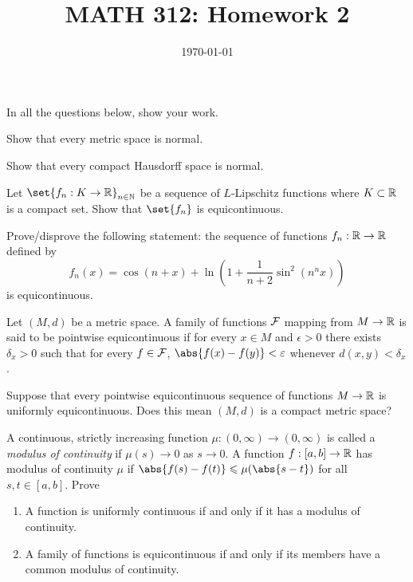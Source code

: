 \documentclass[12pt]{amsart}
\title{ MATH 312: Homework 2 }
\author{}
\date{\today}
\begin{document}
\maketitle



\printbibliography

In all the questions below, show your work.

\begin{question}
	Show that every metric space is normal.
\end{question}

\begin{question}
	Show that every compact Hausdorff space is normal.
\end{question}

\begin{question}
	Let $\set{f_n: K \to \R}_{n\in \N}$ be a sequence of $L$-Lipschitz functions where $K \subset \mathbb{R}$ is a compact set.
	Show that $\set{f_n}$ is equicontinuous.
\end{question}

\begin{question}
	Prove/disprove the following statement:
	the sequence of functions $f_n: \mathbb{R} \to \mathbb{R}$ defined by
	\begin{equation*}
		f_n(x) = \cos(n + x) + \ln \left( 1 + \frac{1}{n + 2} \sin^2 (n^n x) \right)
	\end{equation*}
	is equicontinuous.
\end{question}


\begin{question}
	Let $(M,d)$ be a metric space.
	A family of functions $\mathcal{F}$ mapping from $M \to \mathbb{R}$ is said to be pointwise equicontinuous if for
	every $x \in M$ and $\epsilon > 0$ there exists $\delta_x >0$ such that
	for every $f \in \mathcal{F}$,
	$\abs{f(x) - f(y)} < \epsilon$ whenever $d(x,y) < \delta_x$.

	Suppose that every pointwise equicontinuous sequence of  functions $M \to \mathbb{R}$
	is uniformly equicontinuous.
	Does this mean $(M,d)$ is a compact metric space?
\end{question}

\begin{question}
	A continuous, strictly increasing function $\mu: (0,\infty) \to (0,\infty)$
	is called a \emph{modulus of continuity} if $\mu(s)\to 0$ as $s\to 0$.
	A function $f:[a,b]\to \mathbb{R}$ has modulus of continuity $\mu$ if
	$\abs{f(s) - f(t)} \leq \mu(\abs{s-t})$ for all $s,t\in [a,b]$.
	Prove
	\begin{enumerate}
		\item A function is uniformly continuous if and only if it has a modulus
		      of continuity.
		\item A family of functions is equicontinuous if and only if its members have
		      a common modulus of continuity.
	\end{enumerate}
\end{question}
\end{document}
